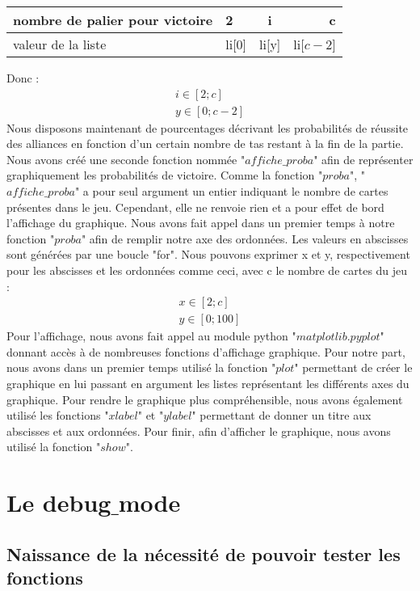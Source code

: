 \documentclass[10pt,a4paper,french,titlepage]{article}
\begin{document}
\begin{center}
\begin{tabular}{|p{3cm}|l|c|r|}
  \hline
  nombre de palier pour victoire & 2 & i & c\\
  \hline
  valeur de la liste & li[0] & li[y] & li[$c-2$] \\
  \hline
\end{tabular}
\end{center}
Donc :
\begin{align*}
i \in [2;c]\\
y \in [0;c-2]
\end{align*}
Nous disposons maintenant de pourcentages décrivant les probabilités de réussite des alliances en fonction d'un certain nombre de tas restant à la fin 
de la partie. Nous avons créé une seconde fonction nommée "$affiche\_proba$" afin de représenter graphiquement les probabilités de victoire. Comme la fonction "$proba$",
"$affiche\_proba$" a pour seul argument un entier indiquant le nombre de cartes présentes dans le jeu. Cependant, elle ne renvoie rien et a pour effet de bord l'affichage
du graphique. Nous avons fait appel dans un premier temps à notre fonction "$proba$" afin de remplir notre axe des ordonnées. Les valeurs en abscisses sont générées par une boucle
"for". Nous pouvons exprimer x et y, respectivement pour les abscisses et les ordonnées comme ceci, avec c le nombre de cartes du jeu :
\begin{align*}
x \in [2;c] \\
y \in [0;100]
\end{align*}
Pour l'affichage, nous avons fait appel au module python "$matplotlib.pyplot$" donnant accès à de nombreuses fonctions d'affichage graphique. Pour notre part, nous avons
dans un premier temps utilisé la fonction "$plot$" permettant de créer le graphique en lui passant en argument les listes représentant les différents axes du graphique.
Pour rendre le graphique plus compréhensible, nous avons également utilisé les fonctions "$xlabel$" et "$ylabel$" permettant de donner un titre aux abscisses et aux
ordonnées. Pour finir, afin d'afficher le graphique, nous avons utilisé la fonction "$show$".



\section{Le debug$\_$mode}
\subsection{Naissance de la nécessité de pouvoir tester les fonctions}
\end{document}
